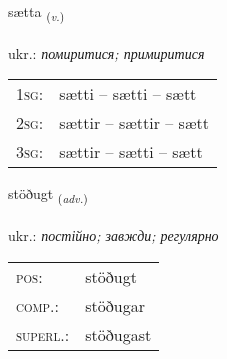 \documentclass[frontgrid, backgrid]{flacards}\usepackage[]{graphicx}\usepackage[]{xcolor}
\begin{document}
\renewcommand{\flhead}{\vskip5pt \fboxsep=0pt {\small\bfseries\footnotesize Sagnorð | дієслово}}
\renewcommand{\fcfoot}{\vskip5pt \fboxsep=0pt \hspace{2pt}{\small\bfseries\footnotesize 2K}}

\renewcommand{\blhead}{\vskip5pt {\small\bfseries\footnotesize Sagnorð | дієслово }}
\renewcommand{\bcfoot}{\vskip5pt \hspace{2pt}{\small\bfseries\footnotesize 2K}}


{sætta \small{\textsubscript{(\textit{v.})}} \\[1ex] %
\textphonetic{[saihta]} \\
ukr.: \emph{помиритися; примиритися} \\  [2ex]
\renewcommand*{\arraystretch}{0.8}
\begin{tabular}{p{1cm}l}
\textsc{1sg}: & sætti -- sætti -- sætt \\ 
\textsc{2sg}: & sættir -- sættir -- sætt \\ 
\textsc{3sg}: & sættir -- sætti -- sætt \\ 
\end{tabular}
}

\renewcommand{\flhead}{\vskip5pt \fboxsep=0pt {\small\bfseries\footnotesize Atviksorð | прислівник}}
\renewcommand{\fcfoot}{\vskip5pt \fboxsep=0pt \hspace{2pt}{\small\bfseries\footnotesize 2K}}

\renewcommand{\blhead}{\vskip5pt {\small\bfseries\footnotesize Atviksorð | прислівник }}
\renewcommand{\bcfoot}{\vskip5pt \hspace{2pt}{\small\bfseries\footnotesize 2K}}


{stöðugt \small{\textsubscript{(\textit{adv.})}} \\[1ex] %
\textphonetic{[stœːðʏxt]} \\
ukr.: \emph{постійно; завжди; регулярно} \\  [2ex]
\renewcommand*{\arraystretch}{0.8}
\begin{tabular}{ll}
\textsc{pos}: & stöðugt \\ 
\textsc{comp.}: & stöðugar \\ 
\textsc{superl.}: & stöðugast \\
\end{tabular}
}
\end{document}
